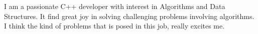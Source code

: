 \documentclass[11pt, a4paper]{awesome-cv}
\begin{document}
\begin{cvletter}
 





I am a passionate C++ developer with interest in Algorithms and Data Structures.
It find great joy in solving challenging problems involving algorithms. 
I think the kind of problems that is posed in this job, really excites me. 


\end{cvletter}


\makeletterclosing
\end{document}

